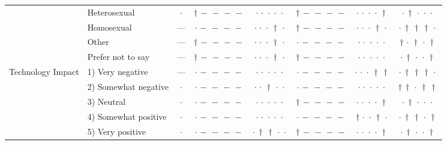 {\begin{longtable}[t]{llcccccc}
 & Heterosexual & $\cdot$ & ${\dagger}\,{-}\,{-}\,{-}\,{-}$ & ${\cdot}\,{\cdot}\,{\cdot}\,{\cdot}\,{\cdot}$ & ${\dagger}\,{-}\,{-}\,{-}\,{-}$ & ${\cdot}\,{\cdot}\,{\cdot}\,{\cdot}\,{\dagger}$ & ${\cdot}\,{\dagger}\,{\cdot}\,{\cdot}\,{\cdot}$ \\
 & Homosexual & --- & ${\cdot}\,{-}\,{-}\,{-}\,{-}$ & ${\cdot}\,{\cdot}\,{\cdot}\,{\dagger}\,{\cdot}$ & ${\dagger}\,{-}\,{-}\,{-}\,{-}$ & ${\cdot}\,{\cdot}\,{\cdot}\,{\dagger}\,{\cdot}$ & ${\cdot}\,{\dagger}\,{\dagger}\,{\dagger}\,{\cdot}$ \\
 & Other & --- & ${\dagger}\,{-}\,{-}\,{-}\,{-}$ & ${\cdot}\,{\cdot}\,{\cdot}\,{\dagger}\,{\cdot}$ & ${\cdot}\,{-}\,{-}\,{-}\,{-}$ & ${\cdot}\,{\cdot}\,{\cdot}\,{\cdot}\,{\cdot}$ & ${\dagger}\,{\cdot}\,{\dagger}\,{\cdot}\,{\dagger}$ \\
 & Prefer not to say & --- & ${\dagger}\,{-}\,{-}\,{-}\,{-}$ & ${\cdot}\,{\cdot}\,{\cdot}\,{\dagger}\,{\cdot}$ & ${\dagger}\,{-}\,{-}\,{-}\,{-}$ & ${\cdot}\,{\cdot}\,{\cdot}\,{\cdot}\,{\cdot}$ & ${\cdot}\,{\dagger}\,{\cdot}\,{\cdot}\,{\dagger}$ \\
\cline{1-8}
\multirow[t]{5}{*}{Technology Impact} & 1) Very negative & --- & ${\cdot}\,{-}\,{-}\,{-}\,{-}$ & ${\cdot}\,{\cdot}\,{\cdot}\,{\cdot}\,{\cdot}$ & ${\cdot}\,{-}\,{-}\,{-}\,{-}$ & ${\cdot}\,{\cdot}\,{\cdot}\,{\dagger}\,{\dagger}$ & ${\cdot}\,{\dagger}\,{\dagger}\,{\dagger}\,{\cdot}$ \\
 & 2) Somewhat negative & $\cdot$ & ${\cdot}\,{-}\,{-}\,{-}\,{-}$ & ${\cdot}\,{\cdot}\,{\dagger}\,{\cdot}\,{\cdot}$ & ${\cdot}\,{-}\,{-}\,{-}\,{-}$ & ${\cdot}\,{\cdot}\,{\cdot}\,{\cdot}\,{\cdot}$ & ${\dagger}\,{\dagger}\,{\cdot}\,{\dagger}\,{\dagger}$ \\
 & 3) Neutral & $\cdot$ & ${\cdot}\,{-}\,{-}\,{-}\,{-}$ & ${\cdot}\,{\cdot}\,{\cdot}\,{\cdot}\,{\cdot}$ & ${\dagger}\,{-}\,{-}\,{-}\,{-}$ & ${\cdot}\,{\cdot}\,{\cdot}\,{\cdot}\,{\dagger}$ & ${\cdot}\,{\dagger}\,{\cdot}\,{\cdot}\,{\cdot}$ \\
 & 4) Somewhat positive & $\cdot$ & ${\cdot}\,{-}\,{-}\,{-}\,{-}$ & ${\cdot}\,{\cdot}\,{\cdot}\,{\cdot}\,{\cdot}$ & ${\cdot}\,{-}\,{-}\,{-}\,{-}$ & ${\dagger}\,{\cdot}\,{\cdot}\,{\dagger}\,{\cdot}$ & ${\cdot}\,{\dagger}\,{\dagger}\,{\cdot}\,{\dagger}$ \\
 & 5) Very positive & $\cdot$ & ${\cdot}\,{-}\,{-}\,{-}\,{-}$ & ${\cdot}\,{\dagger}\,{\dagger}\,{\cdot}\,{\cdot}$ & ${\dagger}\,{-}\,{-}\,{-}\,{-}$ & ${\cdot}\,{\cdot}\,{\cdot}\,{\cdot}\,{\dagger}$ & ${\cdot}\,{\dagger}\,{\cdot}\,{\cdot}\,{\dagger}$ \\

\end{longtable}}
